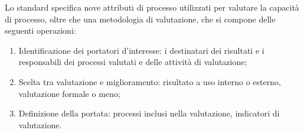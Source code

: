 Lo standard specifica nove attributi di processo utilizzati per valutare la
capacità di processo, oltre che una metodologia di valutazione, che si compone
delle seguenti operazioni:

\begin{enumerate}
  \item Identificazione dei portatori d'interesse: i destinatari dei
    risultati e i responsabili dei processi valutati e delle attività di
    valutazione;
  \item Scelta tra valutazione e miglioramento: risultato a uso interno o
    esterno, valutazione formale o meno;
  \item Definizione della portata: processi inclusi nella valutazione,
    indicatori di valutazione.
\end{enumerate}
